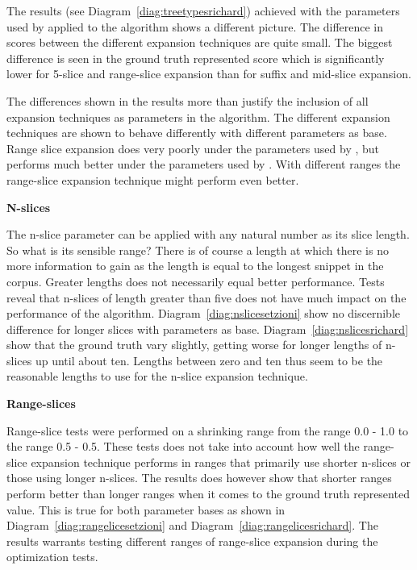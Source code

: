 The results (see Diagram~\ref{diag:treetypesrichard}) achieved with the parameters used by \supervisor applied to the algorithm shows a different picture. The difference in scores between the different expansion techniques are quite small. The biggest difference is seen in the ground truth represented score which is significantly lower for 5-slice and range-slice expansion than for suffix and mid-slice expansion.

The differences shown in the results more than justify the inclusion of all expansion techniques as parameters in the algorithm. The different expansion techniques are shown to behave differently with different parameters as base. Range slice expansion does very poorly under the parameters used by \citeauthor{Oren1998}, but performs much better under the parameters used by \supervisor. With different ranges the range-slice expansion technique might perform even better.

\textbf{N-slices}

The n-slice parameter can be applied with any natural number as its slice length. So what is its sensible range? There is of course a length at which there is no more information to gain as the length is equal to the longest snippet in the corpus. Greater lengths does not necessarily equal better performance. Tests reveal that n-slices of length greater than five does not have much impact on the performance of the algorithm. Diagram~\ref{diag:nslicesetzioni} show no discernible difference for longer slices with \citeauthor{Oren1998} parameters as base. Diagram~\ref{diag:nslicesrichard} show that the ground truth vary slightly, getting worse for longer lengths of n-slices up until about ten. Lengths between zero and ten thus seem to be the reasonable lengths to use for the n-slice expansion technique.

\textbf{Range-slices}

Range-slice tests were performed on a shrinking range from the range 0.0 - 1.0 to the range 0.5 - 0.5. These tests does not take into account how well the range-slice expansion technique performs in ranges that primarily use shorter n-slices or those using longer n-slices. The results does however show that shorter ranges perform better than longer ranges when it comes to the ground truth represented value. This is true for both parameter bases as shown in Diagram~\ref{diag:rangelicesetzioni} and Diagram~\ref{diag:rangelicesrichard}. The results warrants testing different ranges of range-slice expansion during the optimization tests.


